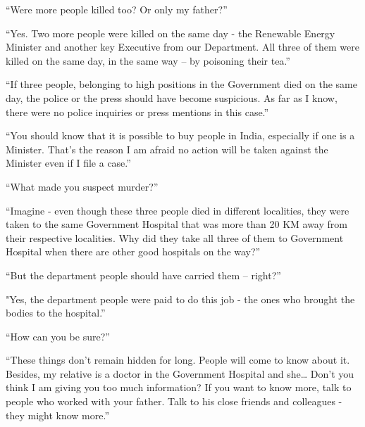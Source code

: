 “Were more people killed too? Or only my father?”

“Yes. Two more people were killed on the same day - the Renewable Energy
Minister and another key Executive from our Department. All three of them were
killed on the same day, in the same way – by poisoning their tea.”

“If three people, belonging to high positions in the Government died on the same
day, the police or the press should have become suspicious. As far as I know,
there were no police inquiries or press mentions in this case.”

“You should know that it is possible to buy people in India, especially if one
is a Minister. That's the reason I am afraid no action will be taken against the
Minister even if I file a case.”

“What made you suspect murder?”

“Imagine - even though these three people died in different localities, they
were taken to the same Government Hospital that was more than 20 KM away from
their respective localities. Why did they take all three of them to Government
Hospital when there are other good hospitals on the way?”

“But the department people should have carried them – right?”

"Yes, the department people were paid to do this job - the ones who brought the
bodies to the hospital.”

“How can you be sure?”

“These things don't remain hidden for long. People will come to know about it.
Besides, my relative is a doctor in the Government Hospital and she… Don't
you think I am giving you too much information? If you want to know more, talk
to people who worked with your father. Talk to his close friends and colleagues
- they might know more.”